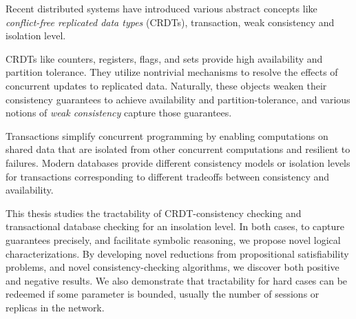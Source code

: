

Recent distributed systems have introduced various abstract concepts like 
\emph{conflict-free replicated data types} (CRDTs), transaction, weak consistency and
isolation level.

CRDTs like counters, registers, flags, and sets provide high availability
and partition tolerance. They utilize nontrivial mechanisms to resolve the effects of
concurrent updates to replicated data. Naturally, these objects weaken their 
consistency guarantees to achieve availability and partition-tolerance, and 
various notions of \emph{weak consistency} capture those guarantees.

Transactions simplify concurrent programming by enabling computations on shared data
that are isolated from other concurrent computations and resilient to failures.
Modern databases provide different consistency models or isolation levels for transactions 
corresponding to different tradeoffs between consistency and availability.

This thesis studies the tractability of CRDT-consistency checking and transactional 
database checking for an insolation level. In both cases, to capture guarantees precisely,
and facilitate symbolic reasoning, we propose novel logical characterizations.
By developing novel reductions from propositional satisfiability problems, and novel
consistency-checking algorithms, we discover both positive and negative results. We also 
demonstrate that tractability for hard cases can be redeemed if some parameter is bounded,
usually the number of sessions or replicas in the network.

